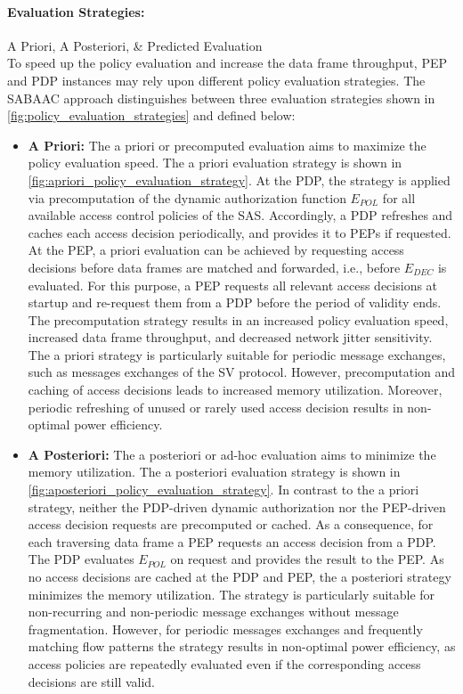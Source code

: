 \paragraph{Evaluation Strategies:} A Priori, A Posteriori, \& Predicted Evaluation\\
To speed up the policy evaluation and increase the data frame throughput, PEP and PDP instances may rely upon different policy evaluation strategies.
The SABAAC approach distinguishes between three evaluation strategies shown in \autoref{fig:policy_evaluation_strategies} and defined below:
\begin{itemize}
    \item \textbf{A Priori:} The a priori or precomputed evaluation aims to maximize the policy evaluation speed.
    The a priori evaluation strategy is shown in \autoref{fig:apriori_policy_evaluation_strategy}.
    At the PDP, the strategy is applied via precomputation of the dynamic authorization function $E_{POL}$ for all available access control policies of the SAS.
    Accordingly, a PDP refreshes and caches each access decision periodically, and provides it to PEPs if requested.
    At the PEP, a priori evaluation can be achieved by requesting access decisions before data frames are matched and forwarded, i.e., before $E_{DEC}$ is evaluated.
    For this purpose, a PEP requests all relevant access decisions at startup and re-request them from a PDP before the period of validity ends.
    The precomputation strategy results in an increased policy evaluation speed, increased data frame throughput, and decreased network jitter sensitivity.
    The a priori strategy is particularly suitable for periodic message exchanges, such as messages exchanges of the SV protocol.
    However, precomputation and caching of access decisions leads to increased memory utilization.
    Moreover, periodic refreshing of unused or rarely used access decision results in non-optimal power efficiency.
    
    \item \textbf{A Posteriori:} The a posteriori or ad-hoc evaluation aims to minimize the memory utilization.
    The a posteriori evaluation strategy is shown in \autoref{fig:aposteriori_policy_evaluation_strategy}.
    In contrast to the a priori strategy, neither the PDP-driven dynamic authorization nor the PEP-driven access decision requests are precomputed or cached.
    As a consequence, for each traversing data frame a PEP requests an access decision from a PDP.
    The PDP evaluates $E_{POL}$ on request and provides the result to the PEP.
    As no access decisions are cached at the PDP and PEP, the a posteriori strategy minimizes the memory utilization.
    The strategy is particularly suitable for non-recurring and non-periodic message exchanges without message fragmentation.
    However, for periodic messages exchanges and frequently matching flow patterns the strategy results in non-optimal power efficiency, as access policies are repeatedly evaluated even if the corresponding access decisions are still valid.


\end{itemize}
